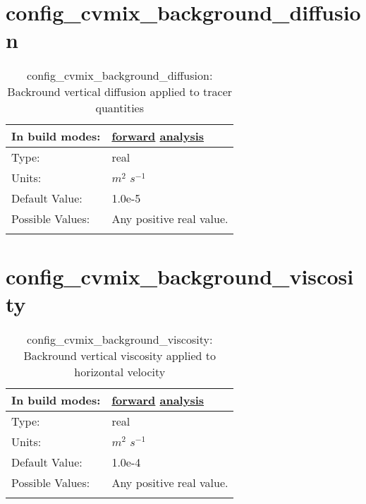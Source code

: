 \section[config\_cvmix\_background\_diffusion]{config\_cvmix\_background\_diffusion}
\label{sec:nm_sec_config_cvmix_background_diffusion}
\begin{center}
\begin{longtable}{| p{2.0in} || p{4.0in} |}
    \hline
    In build modes: & \hyperref[subsec:forward_nm_tab_cvmix]{forward} \hyperref[subsec:analysis_nm_tab_cvmix]{analysis} \\
    \hline
    Type: & real \\
    \hline
    Units: & $m^2$ $s^{-1}$ \\
    \hline
    Default Value: & 1.0e-5 \\
    \hline
    Possible Values: & Any positive real value. \\
    \hline
    \caption{config\_cvmix\_background\_diffusion: Backround vertical diffusion applied to tracer quantities}
\end{longtable}
\end{center}
\section[config\_cvmix\_background\_viscosity]{config\_cvmix\_background\_viscosity}
\label{sec:nm_sec_config_cvmix_background_viscosity}
\begin{center}
\begin{longtable}{| p{2.0in} || p{4.0in} |}
    \hline
    In build modes: & \hyperref[subsec:forward_nm_tab_cvmix]{forward} \hyperref[subsec:analysis_nm_tab_cvmix]{analysis} \\
    \hline
    Type: & real \\
    \hline
    Units: & $m^2$ $s^{-1}$ \\
    \hline
    Default Value: & 1.0e-4 \\
    \hline
    Possible Values: & Any positive real value. \\
    \hline
    \caption{config\_cvmix\_background\_viscosity: Backround vertical viscosity applied to horizontal velocity}
\end{longtable}
\end{center}
